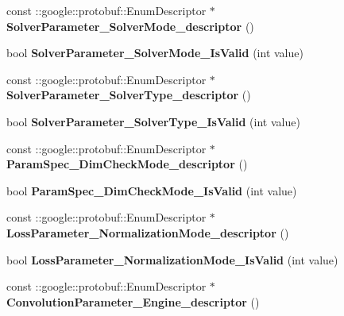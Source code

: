 \begin{DoxyCompactItemize}
\item 
\mbox{\label{namespacecaffe_a63318e106e47ec60592ac66155501a03}} 
const \+::google\+::protobuf\+::\+Enum\+Descriptor $\ast$ {\bfseries Solver\+Parameter\+\_\+\+Solver\+Mode\+\_\+descriptor} ()
\item 
\mbox{\label{namespacecaffe_a7b2f3e44a8950c765ba331e85ed43710}} 
bool {\bfseries Solver\+Parameter\+\_\+\+Solver\+Mode\+\_\+\+Is\+Valid} (int value)
\item 
\mbox{\label{namespacecaffe_a1eec6de91c68df5f62bbc518b54ff2cf}} 
const \+::google\+::protobuf\+::\+Enum\+Descriptor $\ast$ {\bfseries Solver\+Parameter\+\_\+\+Solver\+Type\+\_\+descriptor} ()
\item 
\mbox{\label{namespacecaffe_aef901dafb388e4c83cdd38d7bc60c02c}} 
bool {\bfseries Solver\+Parameter\+\_\+\+Solver\+Type\+\_\+\+Is\+Valid} (int value)
\item 
\mbox{\label{namespacecaffe_aba75986bab9ea0abcedf4afd4bcd4567}} 
const \+::google\+::protobuf\+::\+Enum\+Descriptor $\ast$ {\bfseries Param\+Spec\+\_\+\+Dim\+Check\+Mode\+\_\+descriptor} ()
\item 
\mbox{\label{namespacecaffe_abee22bc98fe4fd35fce114b9cd263aa7}} 
bool {\bfseries Param\+Spec\+\_\+\+Dim\+Check\+Mode\+\_\+\+Is\+Valid} (int value)
\item 
\mbox{\label{namespacecaffe_aba7b5976cb3acb992a92f00a79105570}} 
const \+::google\+::protobuf\+::\+Enum\+Descriptor $\ast$ {\bfseries Loss\+Parameter\+\_\+\+Normalization\+Mode\+\_\+descriptor} ()
\item 
\mbox{\label{namespacecaffe_a09da226c55cb39b33f9db708e506a063}} 
bool {\bfseries Loss\+Parameter\+\_\+\+Normalization\+Mode\+\_\+\+Is\+Valid} (int value)
\item 
\mbox{\label{namespacecaffe_a352ac3da5edc318861911c9856229dd3}} 
const \+::google\+::protobuf\+::\+Enum\+Descriptor $\ast$ {\bfseries Convolution\+Parameter\+\_\+\+Engine\+\_\+descriptor} ()
\item 
\mbox{\label{namespacecaffe_a14c5f30c6f95aae2a687a5bdd7b0db25}} 

\end{DoxyCompactItemize}
